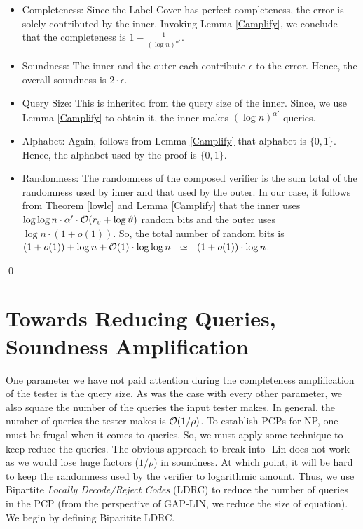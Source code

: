 \begin{itemize}
\item Completeness: Since the Label-Cover has perfect completeness,
  the error is solely contributed by the inner. Invoking Lemma
  \ref{Camplify}, we conclude that the completeness is $1 -
  \frac{1}{(\log n)^{\alpha'}}$.

\item Soundness: The inner and the outer each contribute $\epsilon$ to the error. Hence, the overall soundness is
  $2 \cdot \epsilon $.

\item Query Size: This is inherited from the query size of the
  inner. Since, we use Lemma \ref{Camplify} to obtain it, the
  inner makes $(\log n)^{\alpha'}$ queries.

\item Alphabet: Again, follows from Lemma \ref{Camplify} that alphabet
  is $\{0,1\}$. Hence, the alphabet
used by the proof is $\{0,1\}$.

\item Randomness: The randomness of the composed verifier is the
  sum total of the randomness used by inner and that used by the
  outer. In our case, it follows from Theorem \ref{lowlc} and Lemma
  \ref{Camplify} that the inner uses $\log \log n \cdot \alpha' \cdot
  {\cal O}(r_v + \log \vartheta)$ random bits and the outer uses $\log
  n \cdot (1 +o(1))$. So, the total number of random bits
  is $(1 + o(1)) + \log n + {\cal O}(1) \cdot \log \log n \ \ \simeq \ \ (1 +
    o(1)) \cdot \log n$.
\end{itemize}
\qed



\section{Towards Reducing Queries, Soundness Amplification} \label{section:sound}

One parameter we have not paid attention during the completeness
amplification of the tester is the query size. As was the case with
every other parameter, we also square the number of the queries the
input tester makes. In general, the number of queries the tester makes
is ${\cal O}(1/\rho)$. To establish PCPs for {\sf NP}, one must be frugal
when it comes to queries. So, we must apply some technique to keep
reduce the queries. The obvious approach to break into {-Lin}
does not work as we would lose huge factors ($1/\rho$) in soundness. At
which point, it will be hard to keep the randomness used by the
verifier to logarithmic amount.  Thus, we use Bipartite {\em Locally
  Decode/Reject Codes} (LDRC) to reduce the number of queries in the
PCP (from the perspective of {\sc GAP-LIN}, we reduce the size of
equation).  We begin by defining Biparitite LDRC.


